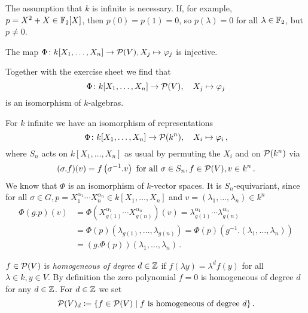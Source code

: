 \begin{warn}
  The assumption that $k$ is infinite is necessary.
  If, for example, $p = X^2 + X \in \mathbb{F}_2[X]$, then $p(0) = p(1) = 0$, so $p(\lambda) = 0$ for all $\lambda \in \mathbb{F}_2$, but $p \neq 0$.
\end{warn}


\begin{cor}
  The map $\Phi \colon k[X_1, \dotsc, X_n] \to \mathcal{P}(V), X_j \mapsto \varphi_j$ is injective.
\end{cor}


Together with the exercise sheet we find that
\[
          \Phi
  \colon  k[X_1, \dotsc, X_n]
  \to     \mathcal{P}(V),
  \quad   X_j
  \mapsto \varphi_j
\]
is an isomorphism of $k$-algebras.


\begin{rem}
  For $k$ infinite we have an isomorphism of representations
  \[
            \Phi
    \colon  k[X_1, \dotsc, X_n]
    \to     \mathcal{P}(k^n),
    \quad   X_i
    \mapsto \varphi_i \,,
  \]
  where $S_n$ acts on $k[X_1, \dotsc, X_n]$ as usual by permuting the $X_i$ and on $\mathcal{P}(k^n)$ via
  \[
      (\sigma.f)(v)
    = f\left( \sigma^{-1}.v \right)
    \text{ for all }
    \sigma \in S_n,
    f \in \mathcal{P}(V),
    v \in k^n \,.
  \]
  We know that $\Phi$ is an isomorphism of $k$-vector spaces.
  It is $S_n$-equivariant, since for all $\sigma \in G, p = X_1^{\alpha_1} \dotsm X_n^{\alpha_n} \in k[X_1, \dotsc, X_n]$ and $v = (\lambda_1, \dotsc, \lambda_n) \in k^n$
  \begin{align*}
       \Phi(g.p)(v)
    &= \Phi\left( X_{g(1)}^{\alpha_1} \dotsm X_{g(n)}^{\alpha_n} \right)(v)
     = \lambda_{g(1)}^{\alpha_1} \dotsm \lambda_{g(n)}^{\alpha_n} \\
    &= \Phi(p)( \lambda_{g(1)}, \dotsc, \lambda_{g(n)} )
     = \Phi(p)\left( g^{-1}.(\lambda_1, \dotsc, \lambda_n) \right) \\
    &= (g.\Phi(p))(\lambda_1, \dotsc, \lambda_n) \,.
  \end{align*}
\end{rem}


\begin{defi}
  $f \in \mathcal{P}(V)$ is \emph{homogeneous of degree $d \in \mathbb{Z}$} if $f(\lambda y) = \lambda^d f(y)$ for all $\lambda \in k, y \in V$.
  By definition the zero polynomial $f=0$ is homogeneous of degree $d$ for any $d \in \mathbb{Z}$.
  For $d \in \mathbb{Z}$ we set
  \[
              \mathcal{P}(V)_d
    \coloneqq \{
                f \in \mathcal{P}(V)
              \mid
                f \text{ is homogeneous of degree } d
              \} \,.
  \]
\end{defi}


